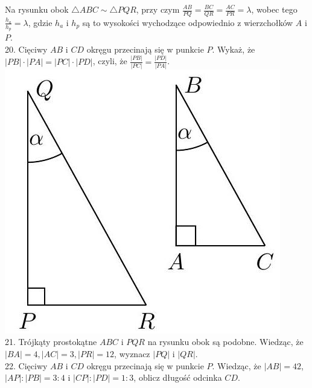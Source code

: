 \documentclass[10pt]{article}
\begin{document}
Na rysunku obok \(\triangle A B C \sim \triangle P Q R\), przy czym \(\frac{A B}{P Q}=\frac{B C}{Q R}=\frac{A C}{P R}=\lambda\), wobec tego \(\frac{h_{a}}{h_{p}}=\lambda\), gdzie \(h_{a}\) i \(h_{p}\) są to wysokości wychodzące odpowiednio z wierzchołków \(A\) i \(P\).\\
20. Cięciwy \(A B\) i \(C D\) okręgu przecinają się w punkcie \(P\). Wykaż, że \(|P B| \cdot|P A|=|P C| \cdot|P D|\), czyli, że \(\frac{|P B|}{|P C|}=\frac{|P D|}{|P A|}\).\\
\includegraphics[max width=\textwidth, center]{2024_11_21_e9b4faa005d5be2cc318g-026(1)}\\
21. Trójkąty prostokątne \(A B C\) i \(P Q R\) na rysunku obok są podobne. Wiedząc, że \(|B A|=4,|A C|=3,|P R|=12\), wyznacz \(|P Q|\) i \(|Q R|\).\\
22. Cięciwy \(A B\) i \(C D\) okręgu przecinają się w punkcie \(P\). Wiedząc, że \(|A B|=42\), \(|A P|:|P B|=3: 4\) i \(|C P|:|P D|=1: 3\), oblicz długość odcinka \(C D\).
\end{document}
